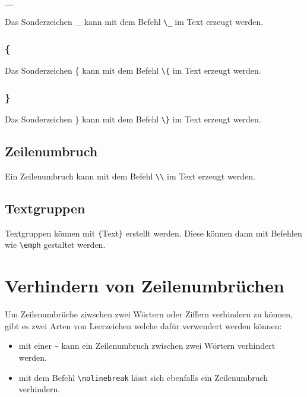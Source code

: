 \documentclass[
12pt,
ngerman
]{scrreprt}
\begin{document}
\subsubsection{\_}
Das Sonderzeichen \_ kann mit dem Befehl \verb!\_! im Text erzeugt werden.
\subsubsection{\{}
Das Sonderzeichen \{ kann mit dem Befehl \verb!\{! im Text erzeugt werden.
\subsubsection{\}}
Das Sonderzeichen \} kann mit dem Befehl \verb!\}! im Text erzeugt werden.
\subsection{Zeilenumbruch}
Ein Zeilenumbruch kann mit dem Befehl \verb!\\! im Text erzeugt werden.
\subsection{Textgruppen}
Textgruppen können mit \verb!{!Text\verb!}! erstellt werden. Diese können dann mit Befehlen wie \verb!\emph! gestaltet werden.
\section{Verhindern von Zeilenumbrüchen}
Um Zeilenumbrüche ziwschen zwei Wörtern oder Ziffern verhindern zu können, gibt es zwei Arten von Leerzeichen welche dafür verwendert werden können:
\begin{itemize}
  \item mit einer \verb!~! kann ein Zeilenumbruch zwischen zwei Wörtern verhindert werden.
  \item mit dem Befehl \verb!\nolinebreak! lässt sich ebenfalls ein Zeilenumbruch verhindern.
\end{itemize}
\end{document}
